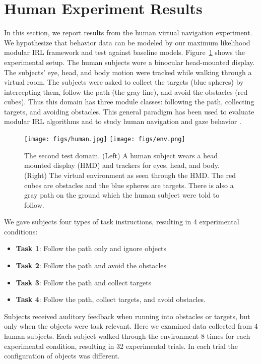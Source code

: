 \documentclass[12pt]{report}	%
\theoremstyle{definition}
\theoremstyle{remark}
\begin{document}
\section{Human Experiment Results}

In this section, we report results from the human virtual navigation experiment. We hypothesize that behavior data can be modeled by our maximum likelihood modular IRL framework and test against baseline models. Figure~\ref{fig:avatar} shows the experimental setup. The human subjects wore a binocular head-mounted
display. The subjects' eye, head, and body motion were tracked while walking through a virtual room. The subjects were asked to collect the targets (blue spheres) by intercepting them, follow the path (the gray line), and avoid the obstacles (red cubes). Thus this domain has three module classes: following the path, collecting targets, and avoiding obstacles. This general paradigm has been used to evaluate modular IRL algorithms \cite{rothkopf2013modular} and to study human navigation and gaze behavior \cite{Tong2014}.

\begin{figure}
\centering
\texttt{[image: figs/human.jpg]}
\texttt{[image: figs/env.png]}
\caption{The second test domain. (Left) A human subject wears a head mounted display (HMD) and trackers
for eyes, head, and body.  (Right) The virtual environment as seen through
the HMD.  The red cubes are obstacles and the blue spheres are targets.
There is also a gray path on the ground which the human subject were told to follow.}
\label{fig:avatar}
\end{figure}

We gave subjects four types of task instructions, resulting in 4 experimental conditions:
\begin{itemize}
\item {\bf Task 1}: Follow the path only and ignore objects 
\item {\bf Task 2}: Follow the path and avoid the obstacles  
\item {\bf Task 3}: Follow the path and collect targets 
\item {\bf Task 4}: Follow the path, collect targets, and avoid obstacles.  
\end{itemize}
Subjects received auditory feedback when running into obstacles or targets, but only when the objects were task relevant. Here we examined data collected from 4 human subjects. Each subject walked through the environment 8 times for each experimental condition, resulting in 32 experimental trials. In each trial the configuration of objects was different. 
\end{document}
